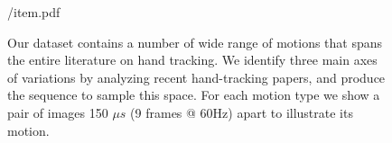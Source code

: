 \begin{figure}[t!]
\centering
\begin{overpic} 
[width=\linewidth]
{\currfiledir/item.pdf}
\end{overpic}
\caption{
% 
Our dataset contains a number of wide range of motions that spans the entire literature on hand tracking. We identify three main axes of variations by analyzing recent hand-tracking papers, and produce the  sequence to sample this space. For each motion type we show a pair of images 150 $\mu s$ (9 frames @ 60Hz) apart to illustrate its motion.
% 
}
\label{fig:motiontypes}
\end{figure}